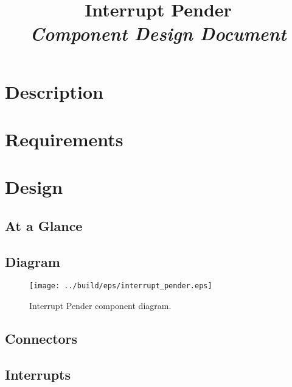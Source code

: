 



\title{\textbf{Interrupt Pender} \\
\large\textit{Component Design Document}}
\date{}
\maketitle

\section{Description}


\section{Requirements}


\section{Design}

\subsection{At a Glance}


\subsection{Diagram}
\begin{figure}[H]
  \texttt{[image: ../build/eps/interrupt\_pender.eps]}
  \caption{Interrupt Pender component diagram.}
\end{figure}



\subsection{Connectors}


\subsection{Interrupts}



